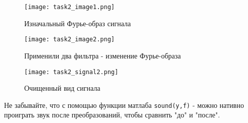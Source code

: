 \begin{figure}[ht]
    \centering
    \texttt{[image: task2\_image1.png]}
    \caption{Изначальный Фурье-образ сигнала}
\end{figure}

\begin{figure}[ht]
    \centering
    \texttt{[image: task2\_image2.png]}
    \caption{Применили два фильтра - изменение Фурье-образа}
\end{figure}

\begin{figure}[ht]
    \centering
    \texttt{[image: task2\_signal2.png]}
    \caption{Очищенный вид сигнала}
\end{figure}
\newpage
 Не забывайте, что с помощью функции матлаба \texttt{sound(y,f)} - можно нативно проиграть звук после преобразований, чтобы сравнить "до" и "после".









\endinput